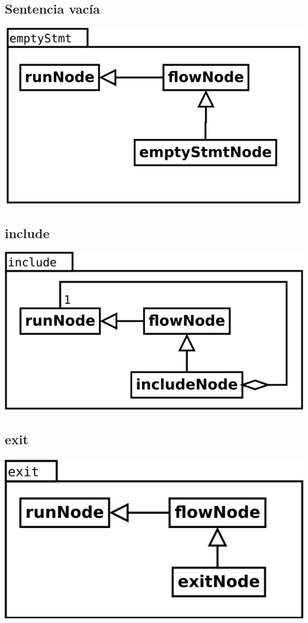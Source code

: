 \subsection{Sentencia vacía}
\begin{center}
\includegraphics[scale=0.4]{emptyStmt.png} \\
\end{center}

\subsection{include}
\begin{center}
\includegraphics[scale=0.4]{include.png} \\
\end{center}

\subsection{exit}
\begin{center}
\includegraphics[scale=0.4]{exit.png} \\
\end{center}

